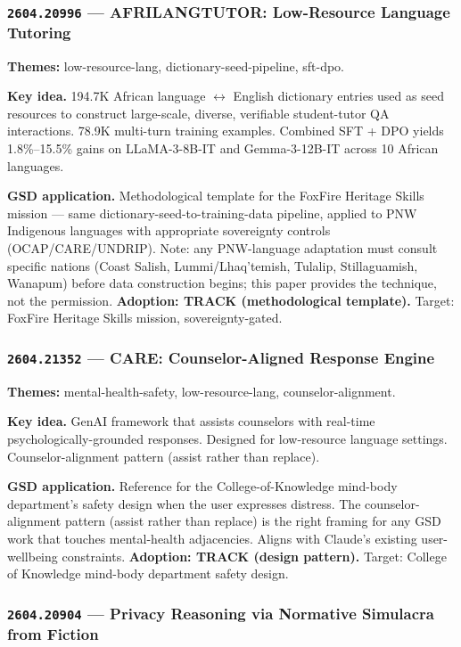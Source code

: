 \documentclass[11pt,letterpaper]{article}
\newcommand{\arxivid}[1]{\texttt{\textcolor{accent}{#1}}}
\newcommand{\paperhead}[2]{\noindent\textbf{\sffamily\textcolor{secondary}{#1}} \textemdash{} #2}
\begin{document}
\subsubsection{\arxivid{2604.20996} --- AFRILANGTUTOR: Low-Resource Language Tutoring}

\paperhead{Themes:}{low-resource-lang, dictionary-seed-pipeline, sft-dpo.}

\textbf{Key idea.} 194.7K African language $\leftrightarrow$ English dictionary entries used as seed resources to construct large-scale, diverse, verifiable student-tutor QA interactions. 78.9K multi-turn training examples. Combined SFT + DPO yields 1.8\%--15.5\% gains on LLaMA-3-8B-IT and Gemma-3-12B-IT across 10 African languages.

\textbf{GSD application.} Methodological template for the FoxFire Heritage Skills mission --- same dictionary-seed-to-training-data pipeline, applied to PNW Indigenous languages with appropriate sovereignty controls (OCAP/CARE/UNDRIP). Note: any PNW-language adaptation must consult specific nations (Coast Salish, Lummi/Lhaq'temish, Tulalip, Stillaguamish, Wanapum) before data construction begins; this paper provides the technique, not the permission. \textbf{Adoption: TRACK (methodological template).} Target: FoxFire Heritage Skills mission, sovereignty-gated.

\subsubsection{\arxivid{2604.21352} --- CARE: Counselor-Aligned Response Engine}

\paperhead{Themes:}{mental-health-safety, low-resource-lang, counselor-alignment.}

\textbf{Key idea.} GenAI framework that assists counselors with real-time psychologically-grounded responses. Designed for low-resource language settings. Counselor-alignment pattern (assist rather than replace).

\textbf{GSD application.} Reference for the College-of-Knowledge mind-body department's safety design when the user expresses distress. The counselor-alignment pattern (assist rather than replace) is the right framing for any GSD work that touches mental-health adjacencies. Aligns with Claude's existing user-wellbeing constraints. \textbf{Adoption: TRACK (design pattern).} Target: College of Knowledge mind-body department safety design.

\subsubsection{\arxivid{2604.20904} --- Privacy Reasoning via Normative Simulacra from Fiction}
\end{document}
